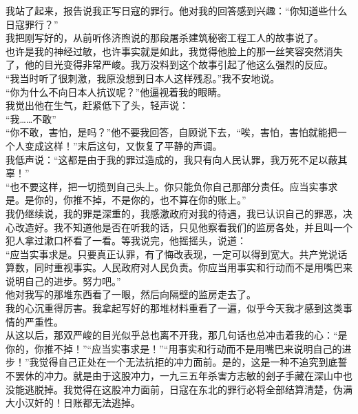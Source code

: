 我站了起来，报告说我正写日寇的罪行。他对我的回答感到兴趣：“你知道些什么日寇罪行？”\\

我把刚写好的，从前听佟济煦说的那段屠杀建筑秘密工程工人的故事说了。\\

也许是我的神经过敏，也许事实就是如此，我觉得他脸上的那一丝笑容突然消失了，他的目光变得非常严峻。我万没料到这个故事引起了他这么强烈的反应。\\

“我当时听了很刺激，我原没想到日本人这样残忍。”我不安地说。\\

“你为什么不向日本人抗议呢？”他逼视着我的眼睛。\\

我觉出他在生气，赶紧低下了头，轻声说：\\

“我……不敢”\\

“你不敢，害怕，是吗？”他不要我回答，自顾说下去，“唉，害怕，害怕就能把一个人变成这样！”末后这句，又恢复了平静的声调。\\

我低声说：“这都是由于我的罪过造成的，我只有向人民认罪，我万死不足以蔽其辜！”\\

“也不要这样，把一切揽到自己头上。你只能负你自己那部分责任。应当实事求是。是你的，你推不掉，不是你的，也不算在你的账上。”\\

我仍继续说，我的罪是深重的，我感激政府对我的待遇，我已认识自己的罪恶，决心改造好。我不知道他是否在听我的话，只见他察看我们的监房各处，并且叫一个犯人拿过漱口杯看了一看。等我说完，他摇摇头，说道：\\

“应当实事求是。只要真正认罪，有了悔改表现，一定可以得到宽大。共产党说话算数，同时重视事实。人民政府对人民负责。你应当用事实和行动而不是用嘴巴来说明自己的进步。努力吧。”\\

他对我写的那堆东西看了一眼，然后向隔壁的监房走去了。\\

我的心沉重得厉害。我拿起写好的那堆材料重看了一遍，似乎今天我才感到这类事情的严重性。\\

从这以后，那双严峻的目光似乎总也离不开我，那几句话也总冲击着我的心：“是你的，你推不掉！”“应当实事求是！”“用事实和行动而不是用嘴巴来说明自己的进步！”我觉得自己正处在一个无法抗拒的冲力面前。是的，这是一种不追究到底誓不罢休的冲力。就是由于这股冲力，一九三五年杀害方志敏的刽子手藏在深山中也没能逃脱掉。我觉得在这股冲力面前，日寇在东北的罪行必将全部结算清楚，伪满大小汉奸的！日账都无法逃掉。\\

